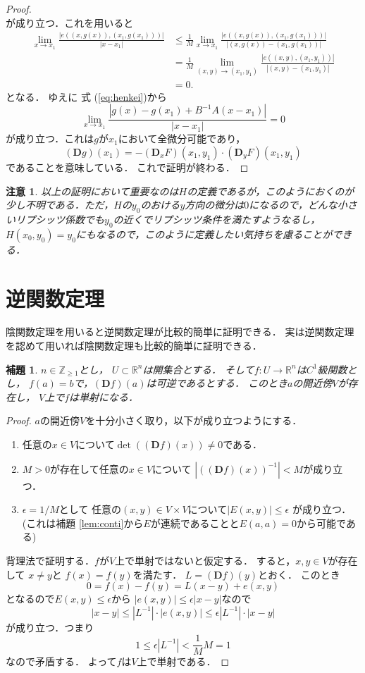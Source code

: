 \documentclass[leqno, a4paper, 12pt]{jsarticle}
\newtheorem{lem}[thm]{補題}
\newtheorem*{rmk}{注意}
\newcommand{\zz}{\mathbb{Z}}
\newcommand{\rr}{\mathbb{R}}
\newcommand{\ddd}{\mathbf{D}}
\begin{document}
\begin{proof}
\[\]
が成り立つ．これを用いると
\begin{align*}
\lim_{x\to x_{1}}\frac{|e((x, g(x)), (x_{1}, g(x_{1})))|}{|x-x_{1}|}
&\le \frac{1}{M}\lim_{x\to x_{1}}\frac{|e((x, g(x)), (x_{1}, g(x_{1})))|}{|(x, g(x))-(x_{1}, g(x_{1}))|}\\
&=
\frac{1}{M}\lim_{(x, y)\to (x_{1}, y_{1})}
\frac{|e((x, y), (x_{1}, y_{1}))|}{|(x, y)-(x_{1}, y_{1})|}\\
&=0. 
\end{align*}
となる．
ゆえに
式 (\ref{eq:henkei})から
\[
\lim_{x\to x_{1}}\frac{|g(x)-g(x_{1})+B^{-1}A(x-x_{1})|}{|x-x_{1}|}=0
\]
が成り立つ．これは$g$が$x_{1}$において全微分可能であり，
\[
(\ddd g)(x_{1})=-(\ddd_{x} F)(x_{1}, y_{1})\cdot (\ddd_{y}F)(x_{1}, y_{1})
\]
であることを意味している．
これで証明が終わる．
\end{proof}

\begin{rmk}
以上の証明において重要なのは$H$の定義であるが，このようにおくのが少し不明である．ただ，$H$の$y_{0}$のおける$y$方向の微分は$0$になるので，どんな小さいリプシッツ係数でも$y_{0}$の近くでリプシッツ条件を満たすようなるし，
$H(x_{0}, y_{0})=y_{0}$にもなるので，このように定義したい気持ちを慮ることができる．
\end{rmk}


\section{逆関数定理}

陰関数定理を用いると逆関数定理が比較的簡単に証明できる．
実は逆関数定理を認めて用いれば陰関数定理も比較的簡単に証明できる．

\begin{lem}\label{lem:tansha}
$n\in \zz_{\ge 1}$とし，
$U\subset \rr^{n}$は開集合とする．
そして$f: U\to \rr^{n}$は$C^{1}$級関数とし，
$f(a)=b$で，$(\ddd f)(a)$は可逆であるとする．
このとき$a$の開近傍$V$が存在し，
$V$上で$f$は単射になる．
\end{lem}
\begin{proof}
$a$の開近傍$V$を十分小さく取り，以下が成り立つようにする．
\begin{enumerate}
\item 
任意の$x\in V$について$\det((\ddd f)(x))\neq 0$である．
\item $M>0$が存在して任意の$x\in V$について
$|((\ddd f)(x))^{-1}|<M$が成り立つ．
\item
$\epsilon=1/M$として
任意の$(x, y)\in V\times V$について$|E(x, y)|\le \epsilon$
が成り立つ．(これは補題 \ref{lem:conti}から$E$が連続であることと$E(a, a)=0$から可能である)
\end{enumerate}
背理法で証明する．$f$が$V$上で単射ではないと仮定する．
すると，$x, y\in V$が存在して
$x\neq y$と
$f(x)=f(y)$を満たす．
$L=(\ddd f)(y)$とおく．
このとき
\[
0=f(x)-f(y)=L(x-y)+e(x, y)
\]
となるので$E(x, y)\le \epsilon$から
$|e(x, y)|\le \epsilon |x-y|$なので
\[
|x-y|\le |L^{-1}|\cdot |e(x, y)|\le \epsilon|L^{-1}|\cdot |x-y|
\]
が成り立つ．つまり
\[
1\le \epsilon|L^{-1}|< \frac{1}{M}M=1
\]
なので矛盾する．
よって$f$は$V$上で単射である．
\end{proof}
\end{document}
